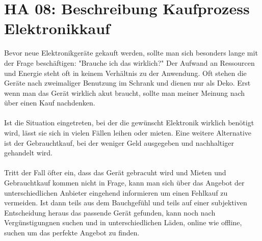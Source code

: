\section{HA 08: Beschreibung Kaufprozess Elektronikkauf}
  Bevor neue Elektronikgeräte gekauft werden, sollte man sich besonders lange mit der Frage beschäftigen: "Brauche ich das wirklich?" Der Aufwand an Ressourcen und Energie steht oft in keinem Verhältnis zu der Anwendung. Oft stehen die Geräte nach zweimaliger Benutzung im Schrank und dienen nur als Deko. Erst wenn man das Gerät wirklich akut braucht, sollte man meiner Meinung nach über einen Kauf nachdenken.\\\\
  Ist die Situation eingetreten, bei der die gewünscht Elektronik wirklich benötigt wird, lässt sie sich in vielen Fällen leihen oder mieten. Eine weitere Alternative ist der Gebrauchtkauf, bei der weniger Geld ausgegeben und nachhaltiger gehandelt wird.\\\\
  Tritt der Fall öfter ein, dass das Gerät gebracuht wird und Mieten und Gebrauchtkauf kommen nicht in Frage, kann man sich über das Angebot der unterschiedlichen Anbieter eingehend informieren um einen Fehlkauf zu vermeiden. Ist dann teils aus dem Bauchgefühl und teils auf einer subjektiven Entscheidung heraus das passende Gerät gefunden, kann noch nach Vergünstigungnen suchen und in unterschiedlichen Läden, online wie offline, suchen um das perfekte Angebot zu finden.
